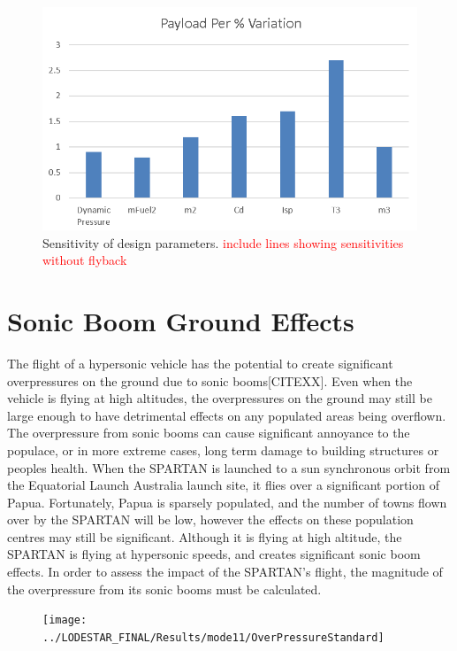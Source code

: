 \begin{figure}[th]
\centering
\includegraphics[width=0.8\linewidth]{figures/6_FlyBack/BarChart}
\caption{Sensitivity of design parameters. \textcolor{red}{include lines showing sensitivities without flyback}}
\label{fig:BarChart}
\end{figure}




\section{Sonic Boom Ground Effects}

The flight of a hypersonic vehicle has the potential to create significant overpressures on the ground due to sonic booms[CITEXX]. Even when the vehicle is flying at high altitudes, the overpressures on the ground may still be large enough to have detrimental effects on any populated areas being overflown. The overpressure from sonic booms can cause significant annoyance to the populace, or in more extreme cases, long term damage to building structures or peoples health. 
When the SPARTAN is launched to a sun synchronous orbit from the Equatorial Launch Australia launch site, it flies over a significant portion of Papua. Fortunately, Papua is sparsely populated, and the number of towns flown over by the SPARTAN will be low, however the effects on these population centres may still be significant. Although it is flying at high altitude, the SPARTAN is flying at hypersonic speeds, and creates significant sonic boom effects. In order to assess the impact of the SPARTAN's flight, the magnitude of the overpressure from its sonic booms must be calculated. 
\begin{figure}[ht]
	\centering
	\texttt{[image: ../LODESTAR\_FINAL/Results/mode11/OverPressureStandard]}
	\caption{}
	\label{fig:OverPressureStandard}
\end{figure}

